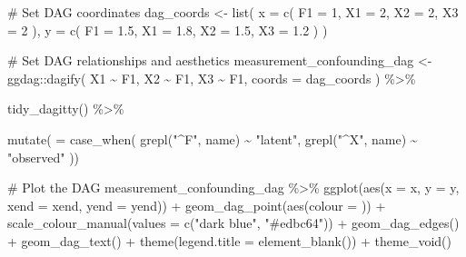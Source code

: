 \documentclass[
  letterpaper,
  DIV=11,
  numbers=noendperiod]{scrreprt}
\newenvironment{Shaded}{\begin{snugshade}}{\end{snugshade}}
\newcommand{\AttributeTok}[1]{\textcolor[rgb]{0.40,0.45,0.13}{#1}}
\newcommand{\CommentTok}[1]{\textcolor[rgb]{0.37,0.37,0.37}{#1}}
\newcommand{\DecValTok}[1]{\textcolor[rgb]{0.68,0.00,0.00}{#1}}
\newcommand{\FloatTok}[1]{\textcolor[rgb]{0.68,0.00,0.00}{#1}}
\newcommand{\FunctionTok}[1]{\textcolor[rgb]{0.28,0.35,0.67}{#1}}
\newcommand{\NormalTok}[1]{\textcolor[rgb]{0.00,0.23,0.31}{#1}}
\newcommand{\OtherTok}[1]{\textcolor[rgb]{0.00,0.23,0.31}{#1}}
\newcommand{\SpecialCharTok}[1]{\textcolor[rgb]{0.37,0.37,0.37}{#1}}
\newcommand{\StringTok}[1]{\textcolor[rgb]{0.13,0.47,0.30}{#1}}
\begin{document}
\begin{Shaded}
\begin{Highlighting}[]
\CommentTok{\# Set DAG coordinates}
\NormalTok{dag\_coords }\OtherTok{\textless{}{-}} \FunctionTok{list}\NormalTok{(}
  \AttributeTok{x =} \FunctionTok{c}\NormalTok{(}
    \AttributeTok{F1 =} \DecValTok{1}\NormalTok{, }
    \AttributeTok{X1 =} \DecValTok{2}\NormalTok{,}
    \AttributeTok{X2 =} \DecValTok{2}\NormalTok{,}
    \AttributeTok{X3 =} \DecValTok{2}
\NormalTok{  ),}
  \AttributeTok{y =} \FunctionTok{c}\NormalTok{(}
    \AttributeTok{F1 =} \FloatTok{1.5}\NormalTok{,}
    \AttributeTok{X1 =} \FloatTok{1.8}\NormalTok{,}
    \AttributeTok{X2 =} \FloatTok{1.5}\NormalTok{,}
    \AttributeTok{X3 =} \FloatTok{1.2}
\NormalTok{  )}
\NormalTok{)}

\CommentTok{\# Set DAG relationships and aesthetics}
\NormalTok{measurement\_confounding\_dag }\OtherTok{\textless{}{-}}\NormalTok{ ggdag}\SpecialCharTok{::}\FunctionTok{dagify}\NormalTok{(}
\NormalTok{  X1 }\SpecialCharTok{\textasciitilde{}}\NormalTok{ F1,}
\NormalTok{  X2 }\SpecialCharTok{\textasciitilde{}}\NormalTok{ F1,}
\NormalTok{  X3 }\SpecialCharTok{\textasciitilde{}}\NormalTok{ F1,}
  \AttributeTok{coords =}\NormalTok{ dag\_coords}
\NormalTok{) }\SpecialCharTok{\%\textgreater{}\%} 
  
  \FunctionTok{tidy\_dagitty}\NormalTok{() }\SpecialCharTok{\%\textgreater{}\%} 
  
  \FunctionTok{mutate}\NormalTok{(}
    \StringTok{\textasciigrave{}}\AttributeTok{ }\StringTok{\textasciigrave{}} \OtherTok{=} \FunctionTok{case\_when}\NormalTok{(}
      \FunctionTok{grepl}\NormalTok{(}\StringTok{"\^{}F"}\NormalTok{, name) }\SpecialCharTok{\textasciitilde{}} \StringTok{"latent"}\NormalTok{,}
      \FunctionTok{grepl}\NormalTok{(}\StringTok{"\^{}X"}\NormalTok{, name) }\SpecialCharTok{\textasciitilde{}} \StringTok{"observed"}
\NormalTok{    ))}

\CommentTok{\# Plot the DAG}
\NormalTok{measurement\_confounding\_dag }\SpecialCharTok{\%\textgreater{}\%}
  \FunctionTok{ggplot}\NormalTok{(}\FunctionTok{aes}\NormalTok{(}\AttributeTok{x =}\NormalTok{ x, }\AttributeTok{y =}\NormalTok{ y, }\AttributeTok{xend =}\NormalTok{ xend, }\AttributeTok{yend =}\NormalTok{ yend)) }\SpecialCharTok{+}
  \FunctionTok{geom\_dag\_point}\NormalTok{(}\FunctionTok{aes}\NormalTok{(}\AttributeTok{colour =} \StringTok{\textasciigrave{}}\AttributeTok{ }\StringTok{\textasciigrave{}}\NormalTok{)) }\SpecialCharTok{+}
  \FunctionTok{scale\_colour\_manual}\NormalTok{(}\AttributeTok{values =} \FunctionTok{c}\NormalTok{(}\StringTok{"dark blue"}\NormalTok{, }\StringTok{"\#edbc64"}\NormalTok{)) }\SpecialCharTok{+} 
  \FunctionTok{geom\_dag\_edges}\NormalTok{() }\SpecialCharTok{+}
  \FunctionTok{geom\_dag\_text}\NormalTok{() }\SpecialCharTok{+}
  \FunctionTok{theme}\NormalTok{(}\AttributeTok{legend.title =} \FunctionTok{element\_blank}\NormalTok{()) }\SpecialCharTok{+}
  \FunctionTok{theme\_void}\NormalTok{()}
\end{Highlighting}
\end{Shaded}
\end{document}
